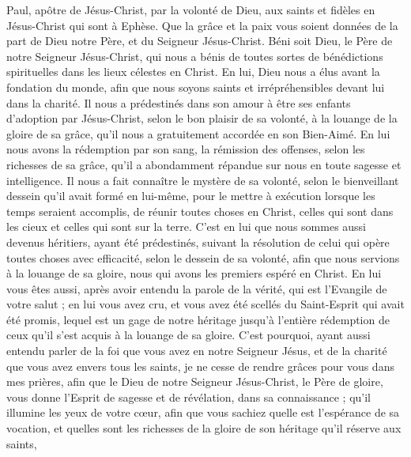 \par\nobreak\noindent\hrulefill
\begin{multicols}{2}
\VerseOne{}Paul, apôtre de Jésus-Christ, par la volonté de Dieu, aux saints et fidèles en Jésus-Christ qui sont à Ephèse.
Que la grâce et la paix vous soient données de la part de Dieu notre Père, et du Seigneur Jésus-Christ.
Béni soit Dieu, le Père de notre Seigneur Jésus-Christ, qui nous a bénis de toutes sortes de bénédictions spirituelles dans les lieux célestes en Christ.
En lui, Dieu nous a élus avant la fondation du monde, afin que nous soyons saints et irrépréhensibles devant lui dans la charité.
Il nous a prédestinés dans son amour à être ses enfants d’adoption par Jésus-Christ, selon le bon plaisir de sa volonté,
à la louange de la gloire de sa grâce, qu’il nous a gratuitement accordée en son Bien-Aimé.
En lui nous avons la rédemption par son sang, la rémission des offenses, selon les richesses de sa grâce,
qu’il a abondamment répandue sur nous en toute sagesse et intelligence.
Il nous a fait connaître le mystère de sa volonté, selon le bienveillant dessein qu’il avait formé en lui-même,
pour le mettre à exécution lorsque les temps seraient accomplis, de réunir toutes choses en Christ, celles qui sont dans les cieux et celles qui sont sur la terre.
C’est en lui que nous sommes aussi devenus héritiers, ayant été prédestinés, suivant la résolution de celui qui opère toutes choses avec efficacité, selon le dessein de sa volonté,
afin que nous servions à la louange de sa gloire, nous qui avons les premiers espéré en Christ.
En lui vous êtes aussi, après avoir entendu la parole de la vérité, qui est l'Evangile de votre salut ; en lui vous avez cru, et vous avez été scellés du Saint-Esprit qui avait été promis,
lequel est un gage de notre héritage jusqu'à l’entière rédemption de ceux qu'il s’est acquis à la louange de sa gloire.
C'est pourquoi, ayant aussi entendu parler de la foi que vous avez en notre Seigneur Jésus, et de la charité que vous avez envers tous les saints,
je ne cesse de rendre grâces pour vous dans mes prières,
afin que le Dieu de notre Seigneur Jésus-Christ, le Père de gloire, vous donne l'Esprit de sagesse et de révélation, dans sa connaissance ;
qu'il illumine les yeux de votre cœur, afin que vous sachiez quelle est l'espérance de sa vocation, et quelles sont les richesses de la gloire de son héritage qu’il réserve aux saints,

\end{multicols}
